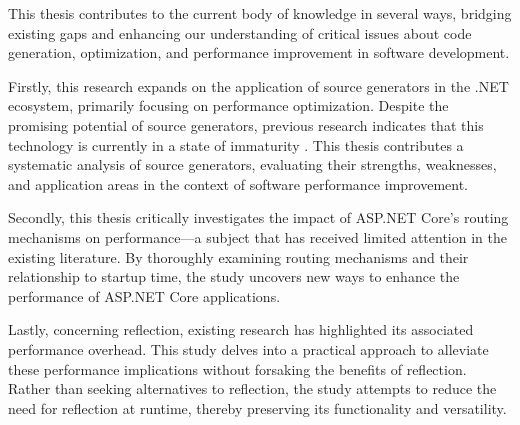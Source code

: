 This thesis contributes to the current body of knowledge in several ways, bridging existing gaps and enhancing our understanding of critical issues about code generation, optimization, and performance improvement in software development.

Firstly, this research expands on the application of source generators in the .NET ecosystem, primarily focusing on performance optimization. Despite the promising potential of source generators, previous research indicates that this technology is currently in a state of immaturity \cite{Slimak2022}. This thesis contributes a systematic analysis of source generators, evaluating their strengths, weaknesses, and application areas in the context of software performance improvement.

Secondly, this thesis critically investigates the impact of ASP.NET Core's routing mechanisms on performance—a subject that has received limited attention in the existing literature. By thoroughly examining routing mechanisms and their relationship to startup time, the study uncovers new ways to enhance the performance of ASP.NET Core applications.

Lastly, concerning reflection, existing research has highlighted its associated performance overhead. This study delves into a practical approach to alleviate these performance implications without forsaking the benefits of reflection. Rather than seeking alternatives to reflection, the study attempts to reduce the need for reflection at runtime, thereby preserving its functionality and versatility.